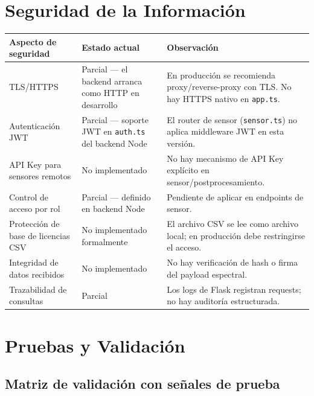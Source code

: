 \section{Seguridad de la Información}

\begin{tabular}{p{5cm}p{4cm}p{6cm}}
\textbf{Aspecto de seguridad} & \textbf{Estado actual} & \textbf{Observación} \\
\hline
TLS/HTTPS & Parcial — el backend arranca como HTTP en desarrollo & En producción se recomienda proxy/reverse-proxy con TLS. No hay HTTPS nativo en \texttt{app.ts}. \\
Autenticación JWT & Parcial — soporte JWT en \texttt{auth.ts} del backend Node & El router de sensor (\texttt{sensor.ts}) no aplica middleware JWT en esta versión. \\
API Key para sensores remotos & No implementado & No hay mecanismo de API Key explícito en sensor/postprocesamiento. \\
Control de acceso por rol & Parcial — definido en backend Node & Pendiente de aplicar en endpoints de sensor. \\
Protección de base de licencias CSV & No implementado formalmente & El archivo CSV se lee como archivo local; en producción debe restringirse el acceso. \\
Integridad de datos recibidos & No implementado & No hay verificación de hash o firma del payload espectral. \\
Trazabilidad de consultas & Parcial & Los logs de Flask registran requests; no hay auditoría estructurada. \\
\end{tabular}

\section{Pruebas y Validación}

\subsection{Matriz de validación con señales de prueba}

